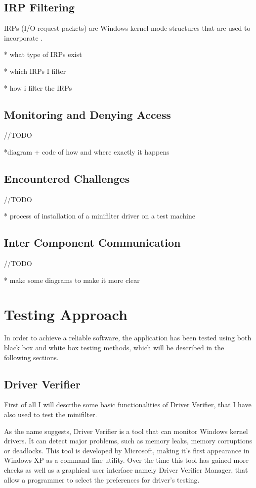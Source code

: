 		\subsection{IRP Filtering}
		IRPs (I/O request packets) are Windows kernel mode structures that are used to incorporate . 
		
		* what type of IRPs exist
		
		* which IRPs I filter
		
		* how i filter the IRPs 
		
		\subsection{Monitoring and Denying Access}
		//TODO
		
		*diagram + code of how and where exactly it happens
		
		\subsection{Encountered Challenges}
		//TODO  
		
		* process of installation of a minifilter driver on a test machine
		
		\subsection{Inter Component Communication}
		//TODO
		
		* make some diagrams to make it more clear
		
		
	\newpage
	
	\section{Testing Approach}
		In order to achieve a reliable software, the application has been tested using both black box and white box testing methods, which will be described in the following sections.
		
		\subsection{Driver Verifier}
		First of all I will describe some basic functionalities of Driver Verifier, that I have also used to test the minifilter.
		
		As the name suggests, Driver Verifier is a tool that can monitor Windows kernel drivers. It can detect major problems, such as memory leaks, memory corruptions or deadlocks. This tool is developed by Microsoft, making it's first appearance in Windows XP as a command line utility. Over the time this tool has gained more checks as well as a graphical user interface namely Driver Verifier Manager, that allow a programmer to select the preferences for driver's testing.
		
